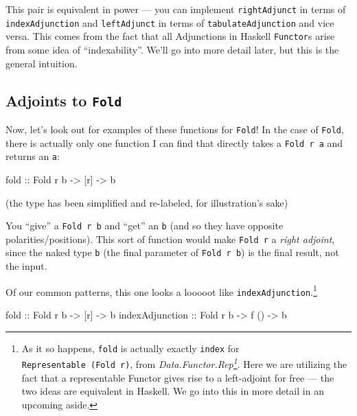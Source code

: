 \documentclass[]{article}
\newenvironment{Shaded}{}{}
\newcommand{\DataTypeTok}[1]{\textcolor[rgb]{0.56,0.13,0.00}{#1}}
\newcommand{\NormalTok}[1]{#1}
\newcommand{\OtherTok}[1]{\textcolor[rgb]{0.00,0.44,0.13}{#1}}
\renewcommand{\href}[2]{#2\footnote{\url{#1}}}
\begin{document}
This pair is equivalent in power --- you can implement \texttt{rightAdjunct} in
terms of \texttt{indexAdjunction} and \texttt{leftAdjunct} in terms of
\texttt{tabulateAdjunction} and vice versa. This comes from the fact that all
Adjunctions in Haskell \texttt{Functor}s arise from some idea of
``indexability''. We'll go into more detail later, but this is the general
intuition.

\subsection{\texorpdfstring{Adjoints to
\texttt{Fold}}{Adjoints to Fold}}\label{adjoints-to-fold}

Now, let's look out for examples of these functions for \texttt{Fold}! In the
case of \texttt{Fold}, there is actually only one function I can find that
directly takes a \texttt{Fold\ r\ a} and returns an \texttt{a}:

\begin{Shaded}
\begin{Highlighting}[]
\OtherTok{fold ::} \DataTypeTok{Fold}\NormalTok{ r b }\OtherTok{{-}\textgreater{}}\NormalTok{ [r] }\OtherTok{{-}\textgreater{}}\NormalTok{ b}
\end{Highlighting}
\end{Shaded}

(the type has been simplified and re-labeled, for illustration's sake)

You ``give'' a \texttt{Fold\ r\ b} and ``get'' an \texttt{b} (and so they have
opposite polarities/positions). This sort of function would make
\texttt{Fold\ r} a \emph{right adjoint}, since the naked type \texttt{b} (the
final parameter of \texttt{Fold\ r\ b}) is the final result, not the input.

Of our common patterns, this one looks a looooot like
\texttt{indexAdjunction}.\footnote{As it so happens, \texttt{fold} is actually
  exactly \texttt{index} for \texttt{Representable\ (Fold\ r)}, from
  \emph{\href{https://hackage.haskell.org/package/adjunctions/docs/Data-Functor-Rep.html}{Data.Functor.Rep}}.
  Here we are utilizing the fact that a representable Functor gives rise to a
  left-adjoint for free --- the two ideas are equivalent in Haskell. We go into
  this in more detail in an upcoming aside.}

\begin{Shaded}
\begin{Highlighting}[]
\OtherTok{fold            ::} \DataTypeTok{Fold}\NormalTok{ r b }\OtherTok{{-}\textgreater{}}\NormalTok{ [r]  }\OtherTok{{-}\textgreater{}}\NormalTok{ b}
\OtherTok{indexAdjunction ::} \DataTypeTok{Fold}\NormalTok{ r b }\OtherTok{{-}\textgreater{}}\NormalTok{ f () }\OtherTok{{-}\textgreater{}}\NormalTok{ b}
\end{Highlighting}
\end{Shaded}
\end{document}
